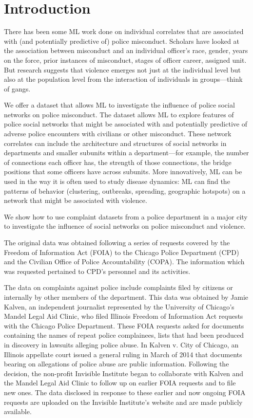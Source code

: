 

\section{Introduction}

There has been some ML work done on individual correlates that are associated
with (and potentially predictive of) police misconduct. Scholars have looked at
the association between misconduct and an individual officer's race, gender,
years on the force, prior instances of misconduct, stages of officer career,
assigned unit. But research suggests that violence emerges not just at the
individual level but also at the population level from the interaction of
individuals in groups—think of gangs. 

 
We offer a dataset that allows ML to investigate the influence of police social
networks on police misconduct. The dataset allows ML to explore features of
police social networks that might be associated with and potentially predictive
of adverse police encounters with civilians or other misconduct. These network
correlates can include the architecture and structures of social networks in
departments and smaller subunits within a department—for example, the number of
connections each officer has, the strength of those connections, the bridge
positions that some officers have across subunits. More innovatively, ML can be
used in the way it is often used to study disease dynamics: ML can find the
patterns of behavior (clustering, outbreaks, spreading, geographic hotspots) on
a network that might be associated with violence. 

 
We show how to use complaint datasets from a police department in a major city
to investigate the influence of social networks on police misconduct and
violence. 


The original data was obtained following a series of requests covered by the
Freedom of Information Act (FOIA) to the Chicago Police Department (CPD) and
the Civilian Office of Police Accountability (COPA). The information which was
requested pertained to CPD's personnel and its activities.

The data on complaints against police include complaints filed by citizens or internally by other members of the department. This data was obtained by Jamie Kalven, an independent journalist represented by the University of Chicago’s Mandel Legal Aid Clinic, who filed Illinois Freedom of Information Act requests with the Chicago Police Department. These FOIA requests asked for documents containing the names of repeat police complainees, lists that had been produced in discovery in lawsuits alleging police abuse. In Kalven v. City of Chicago, an Illinois appellate court issued a general ruling in March of 2014 that documents bearing on allegations of police abuse are public information. Following the decision, the non-profit Invisible Institute began to collaborate with Kalven and the Mandel Legal Aid Clinic to follow up on earlier FOIA requests and to file new ones. The data disclosed in response to these earlier and now ongoing FOIA requests are uploaded on the Invisible Institute’s website and are made publicly available. 

